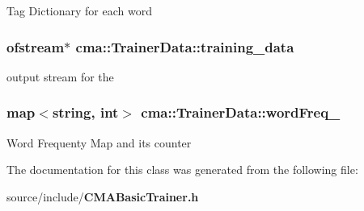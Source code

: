 Tag Dictionary for each word 
\subsubsection[{training\_\-data}]{\setlength{\rightskip}{0pt plus 5cm}ofstream$\ast$ {\bf cma::TrainerData::training\_\-data}}\label{classcma_1_1TrainerData_beca151a5af14873ecd25be4ff926d24}


output stream for the 
\subsubsection[{wordFreq\_\-}]{\setlength{\rightskip}{0pt plus 5cm}map$<$string, int$>$ {\bf cma::TrainerData::wordFreq\_\-}}\label{classcma_1_1TrainerData_1d9d4c16f23c5885d8dfa8c4989be181}


Word Frequenty Map and its counter 

The documentation for this class was generated from the following file:\begin{CompactItemize}
\item 
source/include/{\bf CMABasicTrainer.h}\end{CompactItemize}
